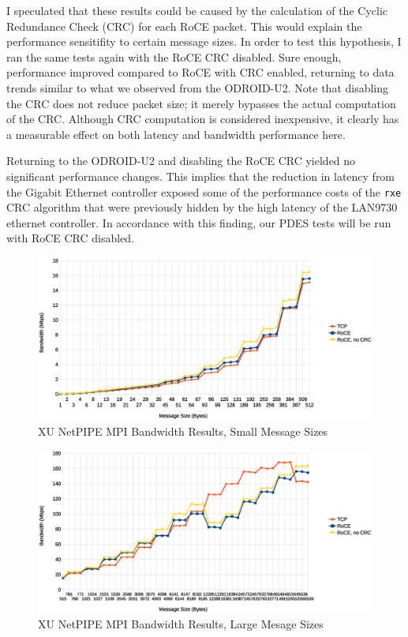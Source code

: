 \documentclass[11pt]{book}
\begin{document}
I speculated that these results could be caused by the calculation of the Cyclic
Redundance Check (CRC) for each RoCE packet. This would explain the performance
sensitifity to certain message sizes. In order to test this hypothesis, I ran
the same tests again with the RoCE CRC disabled. Sure enough, performance
improved compared to RoCE with CRC enabled, returning to data trends similar to
what we observed from the ODROID-U2. Note that disabling the CRC does not reduce
packet size; it merely bypasses the actual computation of the CRC. Although CRC
computation is considered inexpensive, it clearly has a measurable effect on
both latency and bandwidth performance here.

Returning to the ODROID-U2 and disabling the RoCE CRC yielded no significant
performance changes. This implies that the reduction in latency from the Gigabit
Ethernet controller exposed some of the performance costs of the \verb;rxe; CRC
algorithm that were previously hidden by the high latency of the LAN9730
ethernet controller. In accordance with this finding, our PDES tests will be run
with RoCE CRC disabled.

\begin{figure}[h]
\includegraphics[width=\textwidth]{xu_bw_small}
\caption{XU NetPIPE MPI Bandwidth Results, Small Message Sizes}
\label{xu-bw-small}
\end{figure}

\begin{figure}[h]
\includegraphics[width=\textwidth]{xu_bw_large}
\caption{XU NetPIPE MPI Bandwidth Results, Large Mesage Sizes}
\label{xu-bw-large}
\end{figure}
\end{document}
